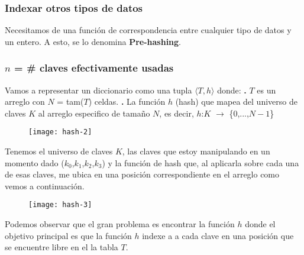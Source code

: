 \documentclass[10pt,a4paper]{article}
\begin{document}
\subsubsection{Indexar otros tipos de datos}

Necesitamos de una función de correspondencia entre cualquier tipo de datos y un entero. A esto, se lo denomina \textbf{Pre-hashing}. 

\subsubsection{$n$ = \# claves efectivamente usadas}

Vamos a representar un diccionario como una tupla $\langle T,h \rangle$ donde: 
\newline
\newline
\textbf{.} $T$ es un arreglo con $N$ = tam($T$) celdas.
\newline
\newline
\textbf{.} La función $h$ (hash) que mapea del universo de claves $K$ al arreglo especifico de tamaño $N$, es decir, $h$:$K$ $\rightarrow$ \{0,...,$N-1$\}

\begin{figure}[h]
	\centering
\texttt{[image: hash-2]}
	\label{drivers1}
\end{figure}

Tenemos el universo de claves $K$, las claves que estoy manipulando en un momento dado ($k_{0}$,$k_{1}$,$k_{2}$,$k_{3}$) y la función de hash que, al aplicarla sobre cada una de esas claves, me ubica en una posición correspondiente en el arreglo como vemos a continuación. 

\begin{figure}[h]
	\centering
\texttt{[image: hash-3]}
	\label{drivers1}
\end{figure}

Podemos observar que el gran problema es encontrar la función $h$ donde el objetivo principal es que la función $h$ indexe a a cada clave en una posición que se encuentre libre en el la tabla $T$.
\newpage
\end{document}
